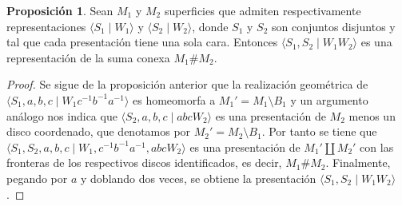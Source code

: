 \documentclass[10pt]{report}
\theoremstyle{definition}
\newtheorem{prop}[defin]{Proposición}
\begin{document}
\begin{prop}%
Sean $M_1$ y $M_2$ superficies que admiten respectivamente representaciones $\langle S_1\mid W_1\rangle $ y $\langle S_2\mid W_2\rangle $, donde $S_1$ y $S_2$ son conjuntos disjuntos y tal que cada presentación tiene una sola cara. Entonces $\langle S_1,S_2\mid W_1W_2\rangle$ es una representación de la suma conexa $M_1 \# M_2$.

\end{prop}

\begin{proof}
Se sigue de la proposición anterior que la realización geométrica de $\langle S_1,a,b,c\mid W_1c^{-1}b^{-1}a^{-1}\rangle$ es homeomorfa a $M_1'=M_1\setminus B_1$ y un argumento análogo nos indica que $\langle S_2,a,b,c\mid abcW_2\rangle$ es una presentación de $M_2$ menos un disco coordenado, que denotamos por $M_2'=M_2\setminus B_1$. Por tanto se tiene que $\langle S_1,S_2,a,b,c\mid W_1,c^{-1}b^{-1}a^{-1},abcW_2\rangle$ es una presentación de $M_1'\amalg M_2'$ con las fronteras de los respectivos discos identificados, es decir, $M_1\# M_2$. Finalmente, pegando por $a$ y doblando dos veces, se obtiene la presentación $\langle S_1,S_2\mid W_1W_2\rangle$.
\end{proof}
\end{document}
